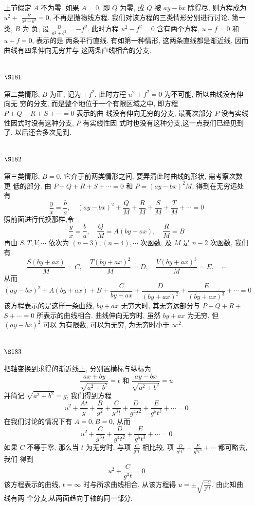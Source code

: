 上节假定 $A$ 不为零. 如果 $A=0$, 即 $Q$ 为零, 或 $Q$ 被 $a y-b x$ 除得尽, 则方程成为 $u^{2}+$ $\frac{B}{a^{2}+b^{2}}=0$, 不再是抛物线方程. 我们对该方程的三类情形分别进行讨论. 第一类, $B$ 为 负, 设 $\frac{B}{a^{2}+b^{2}}=-f^{2}$. 此时方程 $u^{2}-f^{2}=0$ 含有两个方程, $u-f=0$ 和 $u+f=0$, 表示的是 两条平行直线. 有如第一种情形, 这两条直线都是渐近线, 因而曲线有四条伸向无穷并与 这两条直线相合的分支.

\section{$\S 181$}

第二类情形, $B$ 为正, 记为 $+f^{2}$. 此时方程 $u^{2}+f^{2}=0$ 为不可能, 所以曲线没有伸向无 穷的分支, 而是整个地位于一个有限区域之中, 即方程 $P+Q+R+S+\cdots=0$ 表示的曲 线没有伸向无穷的分支, 最高次部分 $P$ 没有实线性因式时没有这种分支, $P$ 有实线性因 式时也没有这种分支,这一点我们已经见到了, 以后还会多次见到.

\section{$\S 182$}

第三类情形, $B=0$, 它介于前两类情形之间, 要弄清此时曲线的形状, 需考察次数更 低的部分. 由 $P+Q+R+S+\cdots=0$ 和 $P=(a y-b x)^{2} M$, 得到在无穷远处有
\[
\frac{y}{x}=\frac{b}{a}, \quad(a y-b x)^{2}+\frac{Q}{M}+\frac{R}{M}+\frac{S}{M}+\frac{T}{M}+\cdots=0
\]
照前面进行代换那样,令
\[
\frac{y}{x}=\frac{b}{a}, \quad \frac{Q}{M}=A(b y+a x), \quad \frac{R}{M}=B
\]
再由 $S, T, V, \cdots$ 依次为 $(n-3),(n-4), \cdots$ 次函数, 及 $M$ 是 $n-2$ 次函数, 我们有
\[
\frac{S(b y+a x)}{M}=C, \quad \frac{T(b y+a x)^{2}}{M}=D, \quad \frac{V(b y+a x)^{3}}{M}=E, \quad \cdots
\]
从而
\[
(a y-b x)^{2}+A(b y+a x)+B+\frac{C}{b y+a x}+\frac{D}{(b y+a x)^{2}}+\frac{E}{(b y+a x)^{3}}+\cdots=0
\]
该方程表示的是这样一条曲线, $b y+a x$ 无穷大时, 其无穷远部分与 $P+Q+R+$ $S+\cdots=0$ 所表示的曲线相合. 曲线伸向无穷时, 虽然 $b y+a x$ 为无穷, 但 $(a y-b x)^{2}$ 可以 为有限数, 可以为无穷, 为无穷时小于 $\infty^{2}$.

\section{$\S 183$}

把轴变换到求得的渐近线上, 分别置横标与纵标为
\[
\frac{a x+b y}{\sqrt{a^{2}+b^{2}}}=t \text { 和 } \frac{a y-b x}{\sqrt{a^{2}+b^{2}}}=u
\]
并简记 $\sqrt{a^{2}+b^{2}}=g$, 我们得到方程
\[
u^{2}+\frac{A t}{g}+\frac{B}{g^{2}}+\frac{C}{g^{3} t}+\frac{D}{g^{4} t^{2}}+\frac{E}{g^{5} t^{3}}+\cdots=0
\]
在我们讨论的情况下有 $A=0, B=0$, 从而
\[
u^{2}+\frac{C}{g^{3} t}+\frac{D}{g^{4} t^{2}}+\frac{E}{g^{5} t^{3}}+\cdots=0
\]
如果 $C$ 不等于零, 那么当 $t$ 为无穷时, 与项 $\frac{C}{g^{3} t}$ 相比较, 项 $\frac{D}{g^{4} t^{2}}+\frac{E}{g^{5} t^{3}}+\cdots$ 都可略去, 我们 得到
\[
u^{2}+\frac{C}{g^{3} t}=0
\]
该方程表示的曲线, $t=\infty$ 时与所求曲线相合, 从该方程得 $u=\pm \sqrt{\frac{-C}{g^{3} t}}$, 由此知曲线有两 个分支,从两面趋向于轴的同一部分.

